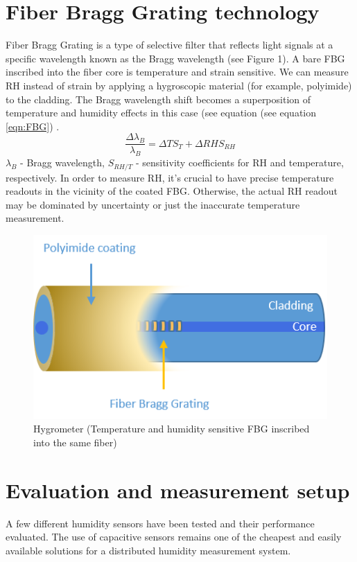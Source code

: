 \section{Fiber Bragg Grating technology}

Fiber Bragg Grating is a type of selective filter that reflects light signals at a specific wavelength known as the Bragg wavelength (see Figure 1). A bare FBG inscribed into the fiber core is temperature and strain sensitive.
We can measure RH instead of strain by applying a hygroscopic material (for example, polyimide) to the cladding. The Bragg wavelength shift becomes a superposition of temperature and humidity effects in this case (see equation (see equation \ref{eqn:FBG}) \cite{Kronenberg:02}. 
                             \begin{equation}\label{eqn:FBG}
                                    \frac{\Delta\lambda_{B}}{\lambda_{B}}=\Delta TS_{T}+\Delta RHS_{RH}
                            \end{equation}
                            $\lambda_{B}$ - Bragg wavelength, $S_{RH/T}$ - sensitivity  coefficients for RH and temperature, respectively. \newline
In order to measure RH, it’s crucial to have precise temperature readouts in the vicinity of the coated FBG. Otherwise, the actual RH readout may be dominated by uncertainty or just the inaccurate temperature measurement.

\begin{figure}[!h]
\centering
\includegraphics[width=0.4\columnwidth]{Chapter4/Images/Picture1.png}
\caption{Hygrometer (Temperature and humidity sensitive FBG inscribed into the same fiber)}
\label{fig_single_photo}
\end{figure}
\section{Evaluation and measurement setup}
A few different humidity sensors have been tested and their performance evaluated. The use of capacitive sensors remains one of the cheapest and easily available solutions for a distributed humidity measurement system. 


